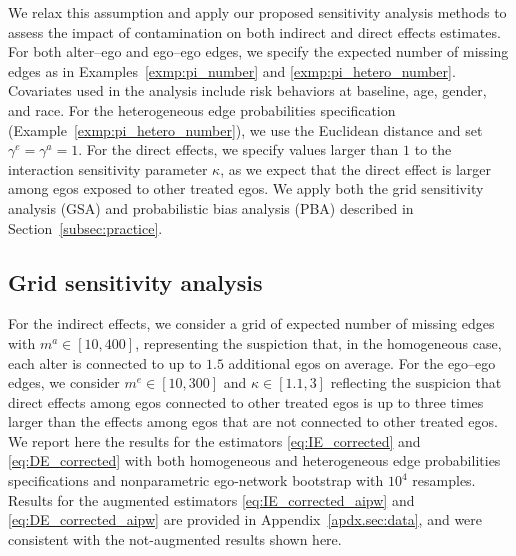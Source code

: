 \documentclass[11pt]{article}
\theoremstyle{definition}
\begin{document}
 We relax this assumption and apply our proposed sensitivity analysis methods
  to assess the impact of contamination on both indirect and direct effects estimates.
  For both alter--ego and ego--ego edges, we specify the expected number of missing edges
   as in Examples~\ref{exmp:pi_number} and \ref{exmp:pi_hetero_number}.
   Covariates used in the analysis include risk behaviors at baseline, age, gender, and race.
 For the heterogeneous edge probabilities specification (Example~\ref{exmp:pi_hetero_number}),
 we use the Euclidean distance and set $\gamma^e=\gamma^a=1$.
 For the direct effects, we specify values larger than $1$ to the interaction sensitivity parameter $\kappa$,
    as we expect that the direct effect is larger among egos exposed to other treated egos.
We apply both the grid sensitivity analysis (GSA) and probabilistic bias analysis (PBA)
 described in Section~\ref{subsec:practice}.
 
\subsection{Grid sensitivity analysis}
\label{subsec:hptn_sa}
For the indirect effects, we consider
a grid of expected number of missing edges with
$m^a \in [10, 400]$, representing the suspiction 
that, in the homogeneous case, each alter is connected to up to $1.5$ additional egos on average.
For the ego--ego edges, we consider $m^e \in [10, 300]$
and $\kappa \in [1.1, 3]$ reflecting the suspicion that direct effects
among egos connected to other treated egos is up to three times larger than the 
effects among egos that are not connected to other treated egos.
We report here the results for the estimators \eqref{eq:IE_corrected} and \eqref{eq:DE_corrected}
with both homogeneous and heterogeneous edge probabilities specifications and 
nonparametric ego-network bootstrap with $10^4$ resamples.
Results for the augmented estimators \eqref{eq:IE_corrected_aipw} and \eqref{eq:DE_corrected_aipw}
are provided in Appendix~\ref{apdx.sec:data}, and were consistent with the not-augmented results shown here.
\end{document}
